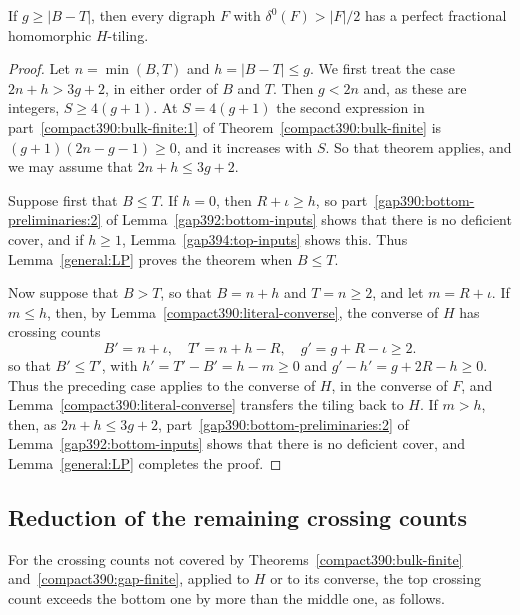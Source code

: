 \begin{theorem}
\label{compact390:gap-finite}
\label{compact390:top-gap-finite}\label{compact390:bottom-gap-finite}
If $g\ge|B-T|$, then every digraph $F$ with $\delta^0(F)>|F|/2$ has a
perfect fractional homomorphic $H$-tiling.
\end{theorem}
\begin{proof}
Let $n=\min(B,T)$ and $h=|B-T|\le g$.
We first treat the case $2n+h>3g+2$, in either order of $B$ and $T$.
Then $g<2n$ and, as these are integers, $S\ge4(g+1)$.
At $S=4(g+1)$ the second expression in
part~\ref{compact390:bulk-finite:1} of Theorem~\ref{compact390:bulk-finite}
is $(g+1)(2n-g-1)\ge0$, and it increases with $S$.
So that theorem applies, and we may assume that $2n+h\le3g+2$.

Suppose first that $B\le T$. If $h=0$, then $R+\iota\ge h$, so part~\ref{gap390:bottom-preliminaries:2} of Lemma~\ref{gap392:bottom-inputs} shows that there is no deficient cover,
and if $h\ge1$, Lemma~\ref{gap394:top-inputs} shows this. Thus Lemma~\ref{general:LP} proves the theorem when $B\le T$.

Now suppose that $B>T$, so that $B=n+h$ and $T=n\ge2$, and let
$m=R+\iota$. If $m\le h$, then, by Lemma~\ref{compact390:literal-converse}, the converse of $H$ has crossing counts
\[
 B'=n+\iota,\quad T'=n+h-R,\quad g'=g+R-\iota\ge2.
\]
so that $B'\le T'$, with $h'=T'-B'=h-m\ge0$ and $g'-h'=g+2R-h\ge0$.
Thus the preceding case applies to the converse of $H$, in the converse of $F$, and Lemma~\ref{compact390:literal-converse} transfers the tiling back to $H$.
If $m>h$, then, as $2n+h\le3g+2$, part~\ref{gap390:bottom-preliminaries:2} of Lemma~\ref{gap392:bottom-inputs}
shows that there is no deficient cover, and Lemma~\ref{general:LP} completes the proof.
\end{proof}


\subsection{Reduction of the remaining crossing counts}
For the crossing counts not covered by Theorems~\ref{compact390:bulk-finite} and~\ref{compact390:gap-finite}, applied to $H$ or to its converse, the top crossing count exceeds the bottom one by more than the middle one, as follows.

